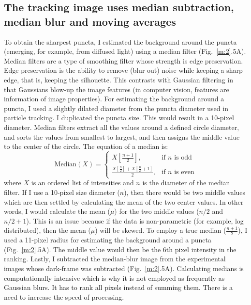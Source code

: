 \subsection{The tracking image uses median subtraction, median blur and moving averages}
To obtain the sharpest puncta, I estimated the background around the puncta (emerging, for example, from diffused light) using a median filter (Fig.~\ref{m:2}.5A). Median filters are a type of smoothing filter whose strength is edge preservation. Edge preservation is the ability to remove (blur out) noise while keeping a sharp edge, that is, keeping the silhouette. This contrasts with Gaussian filtering in that Gaussians blow-up the image features (in computer vision, features are information of image properties). For estimating the background around a puncta, I used a slightly dilated diameter from the puncta diameter used in particle tracking. I duplicated the puncta size. This would result in a 10-pixel diameter. Median filters extract all the values around a defined circle diameter, and sorts the values from smallest to largest, and then assigns the middle value to the center of the circle. The equation of a median is:
\begin{equation*}
\text{Median}(X) = 
\left\{\begin{array}{lr}
X[\frac{n+1}{2}], & \text{if }n \text{ is odd}\\
\frac{X[\frac{n}{2}]+X[\frac{n}{2}+1]}{2},& \text{if }n \text{ is even}
\end{array}\right.
\end{equation*} where $X$ is an ordered list of intensities and $n$ is the diameter of the median filter. If I use a 10-pixel size diameter ($n$), then there would be two middle values which are then settled by calculating the mean of the two center values. In other words, I would calculate the mean ($\mu$) for the two middle values ($n/2$ and $n/2+1$). This is an issue because if the data is non-parametric (for example, log distributed), then the mean ($\mu$) will be skewed. To employ a true median ($\frac{n+1}{2}$), I used a 11-pixel radius for estimating the background around a puncta (Fig.~\ref{m:2}.5A). The middle value would then be the 6th pixel intensity in the ranking. Lastly, I subtracted the median-blur image from the experimental images whose dark-frame was subtracted (Fig.~\ref{m:2}.5A). Calculating medians is computationally intensive which is why it is not employed as frequently as Gaussian blurs. It has to rank all pixels instead of summing them. There is a need to increase the speed of processing.

